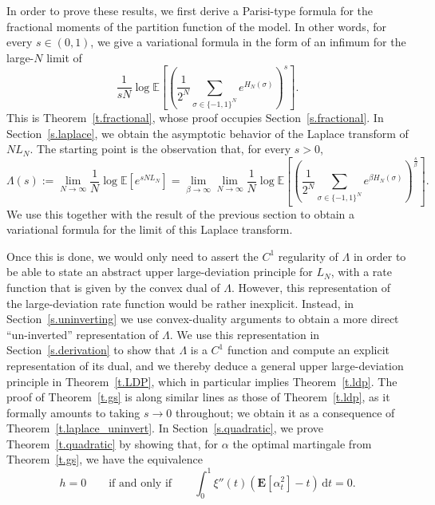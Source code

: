 \documentclass[11pt]{amsart}
\theoremstyle{remark}
\theoremstyle{definition}
\numberwithin{equation}{section}
\numberwithin{proposition}{section}
\numberwithin{figure}{section}
\numberwithin{table}{section}
\newcommand{\E}{\mathbb{E}}
\newcommand{\EE}{\mathbf{E}}
\newcommand{\Ll}{\left}
\newcommand{\Rr}{\right}
\renewcommand{\d}{\mathrm{d}}
\newcommand{\1}{\mathbf{1}}
\begin{document}
In order to prove these results, we first derive a Parisi-type formula for the fractional moments of the partition function of the model. In other words, for every $s \in (0,1)$, we give a variational formula in the form of an infimum for the large-$N$ limit of 
\begin{equation}  
\label{e.disp.fractional}
\frac 1 {sN} \log \E \Ll[\Ll(\frac 1 {2^N} \sum_{\sigma \in \{-1,1\}^N} e^{H_N(\sigma)}\Rr)^s\Rr].
\end{equation}
This is Theorem~\ref{t.fractional}, whose proof occupies Section~\ref{s.fractional}. In Section~\ref{s.laplace}, we obtain the asymptotic behavior of the Laplace transform of $N L_N$. The starting point is the observation that, for every $s > 0$,
\begin{equation}  
\label{e.ln.laplace}
\Lambda(s) := \lim_{N\to\infty}\frac{1}{N}\log \E\Ll[e^{sNL_N}\Rr] = \lim_{\beta\to \infty}\lim_{N\to\infty}\frac{1}{N}\log \E \Ll[\Ll(\frac 1 {2^N} \sum_{\sigma \in \{-1,1\}^N} e^{\beta H_N(\sigma)}\Rr)^{\frac s \beta}\Rr].
\end{equation}
We use this together with the result of the previous section to obtain a variational formula for the limit of this Laplace transform. 


Once this is done, we would only need to assert the $C^1$ regularity of $\Lambda$ in order to be able to state an abstract upper large-deviation principle for $L_N$, with a rate function that is given by the convex dual of $\Lambda$. However, this representation of the large-deviation rate function would be rather inexplicit. Instead, in Section~\ref{s.uninverting} we use convex-duality arguments to obtain a more direct ``un-inverted'' representation of $\Lambda$. We use this representation in Section~\ref{s.derivation} to show that $\Lambda$ is a $C^1$ function and compute an explicit representation of its dual, and we thereby deduce a general upper large-deviation principle in Theorem~\ref{t.LDP}, which in particular implies Theorem~\ref{t.ldp}. 
The proof of Theorem~\ref{t.gs} is along similar lines as those of Theorem~\ref{t.ldp}, as it formally amounts to taking $s \to 0$ throughout; we obtain it as a consequence of Theorem~\ref{t.laplace_uninvert}. In Section~\ref{s.quadratic}, we prove Theorem~\ref{t.quadratic} by showing that, for $\alpha$ the optimal martingale from Theorem~\ref{t.gs}, we have the equivalence
\begin{equation}
\label{e.equiv.conditions}
h = 0 \qquad\text{if and only if}\qquad \int_0^1 \xi''(t) \Ll( \EE \Ll[ \alpha_t^2 \Rr] - t \Rr) \, \d t = 0.
\end{equation}
\end{document}
